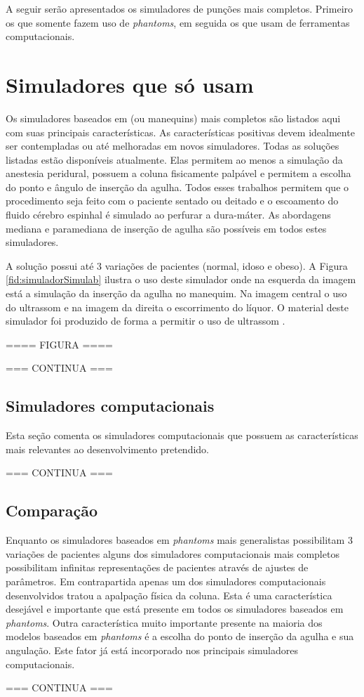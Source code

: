 A seguir serão apresentados os simuladores de punções mais completos. Primeiro os que somente fazem uso de \textit{phantoms}, em seguida os que usam de ferramentas computacionais.  

\section{Simuladores que só usam } \label{sec:SimuladoresPhantoms}

Os simuladores baseados em  (ou manequins) mais completos são listados aqui com suas principais características. As características positivas devem idealmente ser contempladas ou até melhoradas em novos simuladores. Todas as soluções listadas estão disponíveis atualmente. Elas permitem ao menos a simulação da anestesia peridural, possuem a coluna fisicamente palpável e permitem a escolha do ponto e ângulo de inserção da agulha. Todos esses trabalhos permitem que o procedimento seja feito com o paciente sentado ou deitado e o escoamento do fluido cérebro espinhal é simulado ao perfurar a dura-máter. As abordagens mediana e paramediana de inserção de agulha são possíveis em todos estes simuladores.

A solução  possui até 3 variações de pacientes (normal, idoso e obeso). A Figura \ref{fid:simuladorSimulab} ilustra o uso deste simulador onde na esquerda da imagem está a simulação da inserção da agulha no manequim. Na imagem central o uso do ultrassom e na imagem da direita o escorrimento do líquor. O material deste simulador foi produzido de forma a permitir o uso de ultrassom \cite{SimulabCorporation2008}. 

==== FIGURA ====

=== CONTINUA ===

\subsection {Simuladores computacionais}

Esta seção comenta os simuladores computacionais que possuem as características mais relevantes ao desenvolvimento pretendido.

=== CONTINUA ===

\subsection {Comparação}

Enquanto os simuladores baseados em \textit{phantoms} mais generalistas possibilitam 3 variações de pacientes alguns dos simuladores computacionais mais completos possibilitam infinitas representações de pacientes através de ajustes de parâmetros. Em contrapartida apenas um dos simuladores computacionais desenvolvidos tratou a apalpação física da coluna. Esta é uma característica desejável e importante que está presente em todos os simuladores baseados em \textit{phantoms}. Outra característica muito importante presente na maioria dos modelos baseados em \textit{phantoms} é a escolha do ponto de inserção da agulha e sua angulação. Este fator já está incorporado nos principais simuladores computacionais.

=== CONTINUA ===